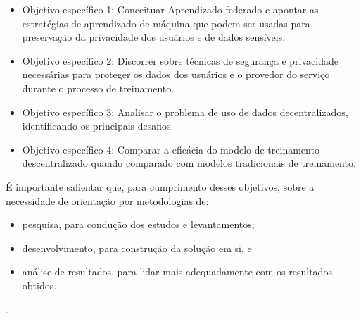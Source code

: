 \begin{itemize}
    \item Objetivo específico 1: Conceituar Aprendizado federado e apontar as estratégias de aprendizado de máquina que podem ser usadas para preservação da privacidade dos usuários e de dados sensíveis.
    \item Objetivo específico 2: Discorrer sobre técnicas de segurança e privacidade necessárias para proteger os dados dos usuários e o provedor do serviço durante o processo de treinamento.
    \item Objetivo específico 3: Analisar o problema de uso de dados decentralizados, identificando os principais desafios.
    \item Objetivo específico 4: Comparar a eficácia do modelo de treinamento descentralizado quando comparado com modelos tradicionais de treinamento.
\end{itemize}

É importante salientar que, para cumprimento desses objetivos, sobre a necessidade de orientação por metodologias de:
\begin{itemize}
    \item pesquisa, para condução dos estudos e levantamentos;
    \item desenvolvimento, para construção da solução em si, e
    \item análise de resultados, para lidar mais adequadamente com os resultados obtidos.
\end{itemize}
.
